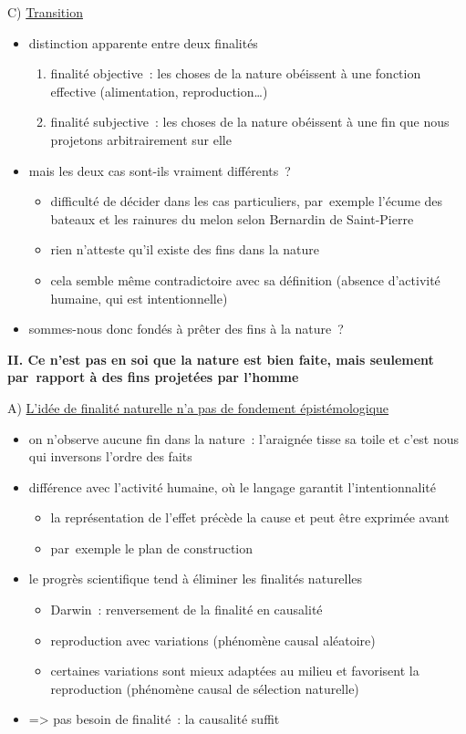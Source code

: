 \documentclass[a4paper,12pt]{report}
\begin{document}
C) \uline{Transition}
\begin{itemize}
\item distinction apparente entre deux finalités
\begin{enumerate}
\item finalité objective : les choses de la nature obéissent à une
fonction effective (alimentation, reproduction\ldots{})
\item finalité subjective : les choses de la nature obéissent à une fin
que nous projetons arbitrairement sur elle
\end{enumerate}
\item mais les deux cas sont-ils vraiment différents ?
\begin{itemize}
\item difficulté de décider dans les cas particuliers, par exemple l'écume
des bateaux et les rainures du melon selon Bernardin de Saint-Pierre
\item rien n'atteste qu'il existe des fins dans la nature
\item cela semble même contradictoire avec sa définition (absence
d'activité humaine, qui est intentionnelle)
\end{itemize}
\item sommes-nous donc fondés à prêter des fins à la nature ?
\end{itemize}

\bigskip


\textbf{II. Ce n'est pas en soi que la nature est bien faite, mais seulement
par rapport à des fins projetées par l'homme}

\medskip

A) \uline{L'idée de finalité naturelle n'a pas de fondement épistémologique}
\begin{itemize}
\item on n'observe aucune fin dans la nature : l'araignée tisse sa toile et
c'est nous qui inversons l'ordre des faits
\item différence avec l'activité humaine, où le langage garantit
l'intentionnalité
\begin{itemize}
\item la représentation de l'effet précède la cause et peut être exprimée
avant
\item par exemple le plan de construction
\end{itemize}
\item le progrès scientifique tend à éliminer les finalités naturelles 
\begin{itemize}
\item Darwin : renversement de la finalité en causalité
\item reproduction avec variations (phénomène causal aléatoire)
\item certaines variations sont mieux adaptées au milieu et favorisent la
reproduction (phénomène causal de sélection naturelle)
\end{itemize}
\item => pas besoin de finalité : la causalité suffit
\end{itemize}
\end{document}
